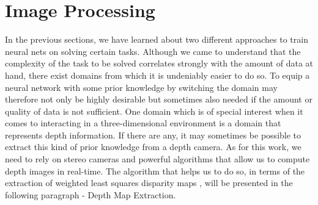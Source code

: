 \FloatBarrier
\section{Image Processing}
\label{sec::33_ip}
In the previous sections, we have learned about two different approaches to train neural nets on solving certain tasks. Although we came to understand that the complexity of the task to be solved correlates strongly with the amount of data at hand, there exist domains from which it is undeniably easier to do so. To equip a neural network with some prior knowledge by switching the domain may therefore not only be highly desirable but sometimes also needed if the amount or quality of data is not sufficient. One domain which is of special interest when it comes to interacting in a three-dimensional environment is a domain that represents depth information. If there are any, it may sometimes be possible to extract this kind of prior knowledge from a depth camera. As for this work, we need to rely on stereo cameras and powerful algorithms that allow us to compute depth images in real-time. The algorithm that helps us to do so, in terms of the extraction of weighted least squares disparity maps \cite{min2014fast}, will be presented in the following paragraph - Depth Map Extraction.
\FloatBarrier
